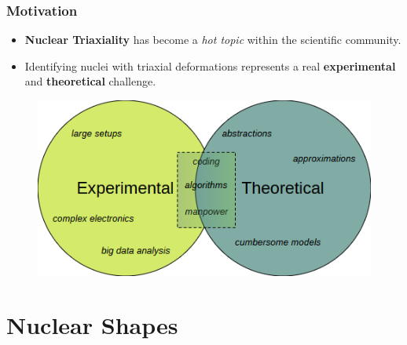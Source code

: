 \documentclass{beamer}
\begin{document}
\begin{frame}
	\frametitle{Motivation}
    \vspace{-0.3cm}
    \begin{itemize}
        \item \textbf{Nuclear Triaxiality} has become a \emph{hot topic} within the scientific community.
        \item Identifying nuclei with triaxial deformations represents a real \textbf{experimental} and \textbf{theoretical} challenge.
    \end{itemize}
    \vspace{-0.2cm}
    \begin{figure}
        \centering
        \includegraphics[scale=0.7]{figures/exp_vs_theory.png}
    \end{figure}
\end{frame}


\section{Nuclear Shapes}
\end{document}

